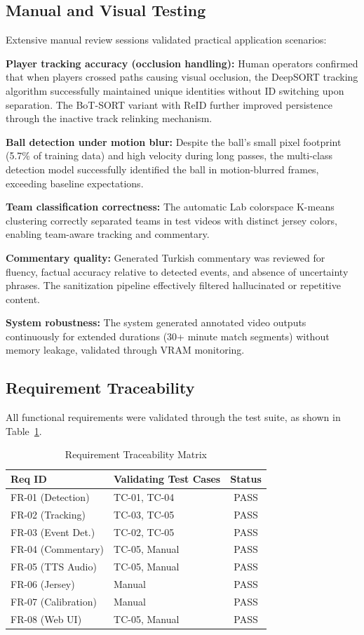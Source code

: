 \documentclass[10pt,twocolumn,a4paper]{article}
\begin{document}
\subsection{Manual and Visual Testing}

Extensive manual review sessions validated practical application scenarios:

\textbf{Player tracking accuracy (occlusion handling):} Human operators confirmed that when players crossed paths causing visual occlusion, the DeepSORT tracking algorithm successfully maintained unique identities without ID switching upon separation. The BoT-SORT variant with ReID further improved persistence through the inactive track relinking mechanism.

\textbf{Ball detection under motion blur:} Despite the ball's small pixel footprint (5.7\% of training data) and high velocity during long passes, the multi-class detection model successfully identified the ball in motion-blurred frames, exceeding baseline expectations.

\textbf{Team classification correctness:} The automatic Lab colorspace K-means clustering correctly separated teams in test videos with distinct jersey colors, enabling team-aware tracking and commentary.

\textbf{Commentary quality:} Generated Turkish commentary was reviewed for fluency, factual accuracy relative to detected events, and absence of uncertainty phrases. The sanitization pipeline effectively filtered hallucinated or repetitive content.

\textbf{System robustness:} The system generated annotated video outputs continuously for extended durations (30+ minute match segments) without memory leakage, validated through VRAM monitoring.

\subsection{Requirement Traceability}

All functional requirements were validated through the test suite, as shown in Table~\ref{tab:rtm}.

\begin{table}[H]
\centering
\caption{Requirement Traceability Matrix}
\label{tab:rtm}
\scriptsize
\begin{tabularx}{\columnwidth}{l X c}
\toprule
\textbf{Req ID} & \textbf{Validating Test Cases} & \textbf{Status} \\
\midrule
FR-01 (Detection) & TC-01, TC-04 & PASS \\
FR-02 (Tracking) & TC-03, TC-05 & PASS \\
FR-03 (Event Det.) & TC-02, TC-05 & PASS \\
FR-04 (Commentary) & TC-05, Manual & PASS \\
FR-05 (TTS Audio) & TC-05, Manual & PASS \\
FR-06 (Jersey) & Manual & PASS \\
FR-07 (Calibration) & Manual & PASS \\
FR-08 (Web UI) & TC-05, Manual & PASS \\
\bottomrule
\end{tabularx}
\end{table}
\end{document}
